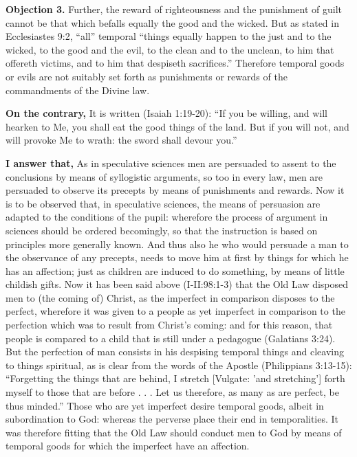 \textbf{Objection 3.} Further, the reward of righteousness and the punishment of guilt cannot be that which befalls equally the good and the wicked. But as stated in Ecclesiastes 9:2, ``all'' temporal ``things equally happen to the just and to the wicked, to the good and the evil, to the clean and to the unclean, to him that offereth victims, and to him that despiseth sacrifices.'' Therefore temporal goods or evils are not suitably set forth as punishments or rewards of the commandments of the Divine law.

\textbf{On the contrary,} It is written (Isaiah 1:19-20): ``If you be willing, and will hearken to Me, you shall eat the good things of the land. But if you will not, and will provoke Me to wrath: the sword shall devour you.''

\textbf{I answer that,} As in speculative sciences men are persuaded to assent to the conclusions by means of syllogistic arguments, so too in every law, men are persuaded to observe its precepts by means of punishments and rewards. Now it is to be observed that, in speculative sciences, the means of persuasion are adapted to the conditions of the pupil: wherefore the process of argument in sciences should be ordered becomingly, so that the instruction is based on principles more generally known. And thus also he who would persuade a man to the observance of any precepts, needs to move him at first by things for which he has an affection; just as children are induced to do something, by means of little childish gifts. Now it has been said above (I-II:98:1-3) that the Old Law disposed men to (the coming of) Christ, as the imperfect in comparison disposes to the perfect, wherefore it was given to a people as yet imperfect in comparison to the perfection which was to result from Christ's coming: and for this reason, that people is compared to a child that is still under a pedagogue (Galatians 3:24). But the perfection of man consists in his despising temporal things and cleaving to things spiritual, as is clear from the words of the Apostle (Philippians 3:13-15): ``Forgetting the things that are behind, I stretch [Vulgate: 'and stretching'] forth myself to those that are before . . . Let us therefore, as many as are perfect, be thus minded.'' Those who are yet imperfect desire temporal goods, albeit in subordination to God: whereas the perverse place their end in temporalities. It was therefore fitting that the Old Law should conduct men to God by means of temporal goods for which the imperfect have an affection.

